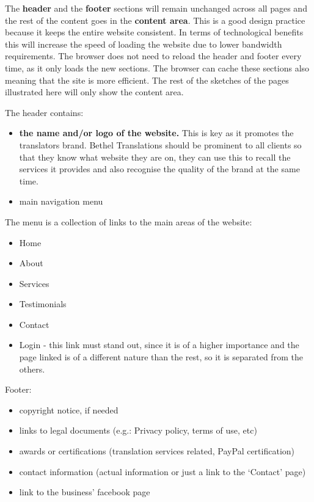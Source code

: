 \documentclass{l3proj}
\begin{document}
The \textbf{header} and the \textbf{footer} sections will remain unchanged
across all pages and the rest of the content goes in the \textbf{content area}.
This is a good design practice because it keeps the entire website consistent. In 
terms of technological benefits this will increase the speed of loading the website 
due to lower bandwidth requirements. The browser does not need to reload the header 
and footer every time, as it only loads the new sections. The browser can cache
these sections also meaning that the site is more efficient.
The rest of the sketches of the pages illustrated here will only show the
content area.

The header contains:
\begin{itemize} \itemsep1pt \parskip0pt 
	\item \textbf{the name and/or logo of the website.} This is key as it
promotes the translators brand. Bethel Translations should be prominent to all
clients so that they know what website they are on, they can use this to recall
the services it provides and also recognise the quality of the brand at the same
time. 
	\item main navigation menu
\end{itemize}

The menu is a collection of links to the main areas of the website:
\begin{itemize} \itemsep1pt \parskip0pt 
	\item Home
	\item About
	\item Services
	\item Testimonials
	\item Contact
	\item Login - this link must stand out, since it is of a higher
	importance and the page linked is of a different nature than the rest,
	so it is separated from the others.
\end{itemize}


Footer:
\begin{itemize} \itemsep1pt \parskip0pt 
	\item copyright notice, if needed
	\item links to legal documents (e.g.: Privacy policy, terms of use, etc)
	\item awards or certifications (translation services related, 
	PayPal certification)
	\item contact information (actual information or just a link to the 
	`Contact’ page)
	\item link to the business’ facebook page
\end{itemize}
\end{document}

